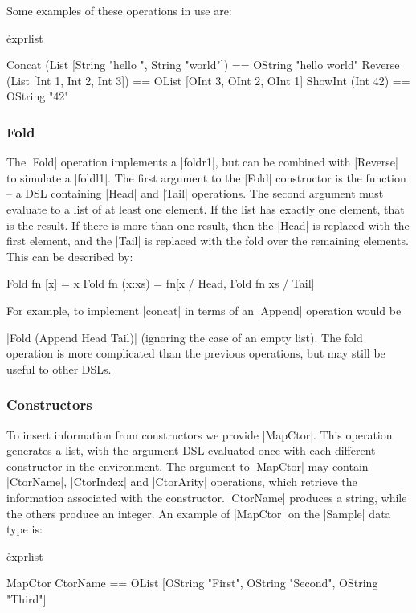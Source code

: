\documentclass[preprint,draft]{sigplanconf}
\begin{document}
Some examples of these operations in use are:

\h{exprlist}\begin{code}
Concat (List [String "hello ", String "world"])
    == OString "hello world"
Reverse (List [Int 1, Int 2, Int 3])
    == OList [OInt 3, OInt 2, OInt 1]
ShowInt (Int 42) == OString "42"
\end{code}

\subsubsection{Fold}

The |Fold| operation implements a |foldr1|, but can be combined with |Reverse| to simulate a |foldl1|. The first argument to the |Fold| constructor is the function -- a DSL containing |Head| and |Tail| operations. The second argument must evaluate to a list of at least one element. If the list has exactly one element, that is the result. If there is more than one result, then the |Head| is replaced with the first element, and the |Tail| is replaced with the fold over the remaining elements. This can be described by:

\ignore\begin{code}
Fold fn [x] = x
Fold fn (x:xs) = fn[x / Head, Fold fn xs / Tail]
\end{code}

For example, to implement |concat| in terms of an |Append| operation would be \ignore|Fold (Append Head Tail)| (ignoring the case of an empty list). The fold operation is more complicated than the previous operations, but may still be useful to other DSLs.

\subsubsection{Constructors}

To insert information from constructors we provide |MapCtor|. This operation generates a list, with the argument DSL evaluated once with each different constructor in the environment. The argument to |MapCtor| may contain |CtorName|, |CtorIndex| and |CtorArity| operations, which retrieve the information associated with the constructor. |CtorName| produces a string, while the others produce an integer. An example of |MapCtor| on the |Sample| data type is:

\h{exprlist}\begin{code}
MapCtor CtorName == OList
    [OString "First", OString "Second", OString "Third"]
\end{code}
\end{document}
